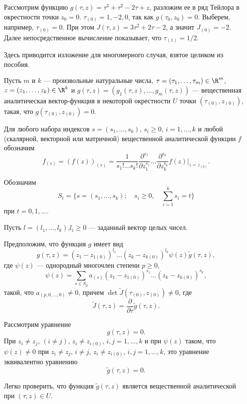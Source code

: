 \begin{ex}
    Рассмотрим функцию $g(\tau, z) = \tau^3 + \tau^2 - 2\tau + z$, разложим ее в ряд Тейлора в окрестности точки $z_0 = 0$.
    $\tau_{(0)} = 1, -2, 0$, так как $g(\tau_0, z_0) = 0$.
    Выберем, например, $\tau_{(0)} = 0$.
    При этом $J(\tau, z) = 3 \tau^2 + 2\tau -2$, а значит $J_{(0)} = -2$.
    Далее непосредственное вычисление показывает, что $\tau_{(1)} = 1/2$.
\end{ex}

\bigskip
Здесь приводится изложение для многомерного случая, взятое целиком из пособия.

Пусть $m$ и $k$ --- произвольные натуральные числа,
    $\tau=(\tau_1,\ldots,\tau_m) \in {\R}^m$, $z=(z_1,\ldots,z_k)\in
{\R}^k$ и $g(\tau,z)=(g_1(\tau,z), \ldots,g_m(\tau,z))$ ---
вещественная аналитическая вектор-функция в некоторой окрестности
$U$ точки $(\tau_{(0)},z_{(0)})$, такая, что
$g(\tau_{(0)},z_{(0)})=0$.

Для любого набора индексов $s=(s_1,\ldots,s_k)$, $s_i\geq 0$,
    $i=1,\ldots,k$ и любой (скалярной, векторной или матричной)
    вещественной аналитической функции $f$ обозначим
    $$
    f_{(s)}=\left(f(z)\right)_{(s)}=\frac{1}{s_1!\ldots s_k!}
    \frac{\partial^{s_1}}{\partial z_1^{s_1}}\ldots
    \frac{\partial^{s_k}}{\partial z_k^{s_k}} f(z)|_{z=z_{(0)}}.
    $$

    Обозначим
    $$
    S_t=\{s=(s_1,\ldots,s_k);\quad s_i\geq 0,\quad \sum^k_{i=1} s_i=t\}
    $$
    при $t=0,1,\ldots$.

    Пусть $l=(l_1,\ldots,l_k)$,$l_i\geq 0$ --- заданный вектор целых
    чисел.

    Предположим, что функция $g$ имеет вид
    $$
    g(\tau,z)=(z_1-z_{1(0)})^{l_1}\ldots (z_k-z_{k(0)})^{l_k}
    \psi(z)\tilde g(\tau,z),
    $$
    где $\psi(z)$ --- однородный многочлен степени $p\geq 0$,
    $$
    \psi(z)=\sum_{s\in S_p}a_{(s)}(z_1-z_{1(0)})^{s_1}\ldots
    (z_k-z_{k(0)})^{s_k},
    $$
    такой, что $a_{(p,0,\ldots,0)}\ne 0$, причем $\det \tilde
    J(\tau_{(0)},z_{(0)})\ne 0$, где
    $$
    \tilde J(\tau,z)=\frac{\partial}{\partial\tau}\tilde g(\tau,z).
    $$

    Рассмотрим уравнение
    $$
    g(\tau,z)=0.
    $$
    При $z_i\ne z_j$, $(i\ne j)$, $z_i\ne z_{i(0)}$, $i,j=1,\ldots,k$ и
    при $\psi(z)$ таком, что $\psi(z)\ne 0$ при $z_i\ne z_j$, $i\ne j$,
    $z_i\ne z_{i(0)}$, $i,j=1,\ldots,k$, это уравнение эквивалентно
    уравнению
    $$
    \tilde g(\tau,z)=0.
    $$

    Легко проверить, что функция $\tilde g(\tau,z)$ является
    вещественной аналитической при $(\tau,z)\in U$.

